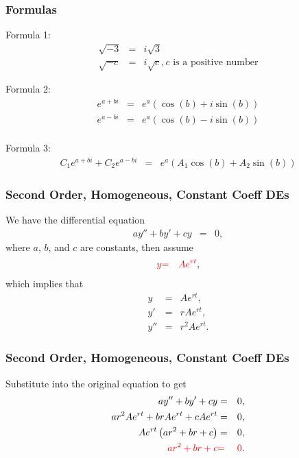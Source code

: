 \begin{frame}
  \frametitle{Formulas}
Formula 1:
  {\color{brown}
  \begin{eqnarray*}
  \sqrt{-3} & = & i\sqrt{3}\\
  \sqrt{-c} & = & i\sqrt{c}, c \text{ is a positive number}
  \end{eqnarray*}
  }

Formula 2:
  {\color{red}
  \begin{eqnarray*}
  e^{a+bi} & = & e^a (\cos(b) + i\sin(b))\\
  e^{a-bi} & = & e^a (\cos(b) - i\sin(b))\\
  \end{eqnarray*}
  }

Formula 3:
  {\color{blue}
  \begin{eqnarray*}
  C_1 e^{a+bi} + C_2  e^{a-bi} & = & e^a (A_1\cos(b) + A_2\sin(b))
  \end{eqnarray*}
  }

\end{frame}

\begin{frame}
  \frametitle{Second Order, Homogeneous, Constant Coeff DEs}

  We have the differential equation
  \begin{eqnarray*}
    a y'' + by' + cy & = & 0,
  \end{eqnarray*}
  where $a$, $b$, and $c$ are constants, then assume
  \begin{eqnarray*}
    {\color{red} y } & {\color{red} = } & {\color{red}A e^{rt}},
  \end{eqnarray*}
  which implies that
  \begin{eqnarray*}
    y   & = & A e^{rt}, \\
    y'  & = & r A e^{rt}, \\
    y'' & = & r^2 A e^{rt}.
  \end{eqnarray*}

\end{frame}

\begin{frame}
  \frametitle{Second Order, Homogeneous, Constant Coeff DEs}

  Substitute into the original equation to get
  \begin{eqnarray*}
    a y'' + by' + cy & = & 0, \\
    a r^2 A e^{rt} + b r A e^{rt} + c A e^{rt} & = & 0, \\
    A e^{rt} \left( ar^2 + br + c \right) & = & 0, \\
    {\color{red} ar^2 + br + c } & {\color{red} = } & {\color{red} 0}.
  \end{eqnarray*}

\end{frame}


